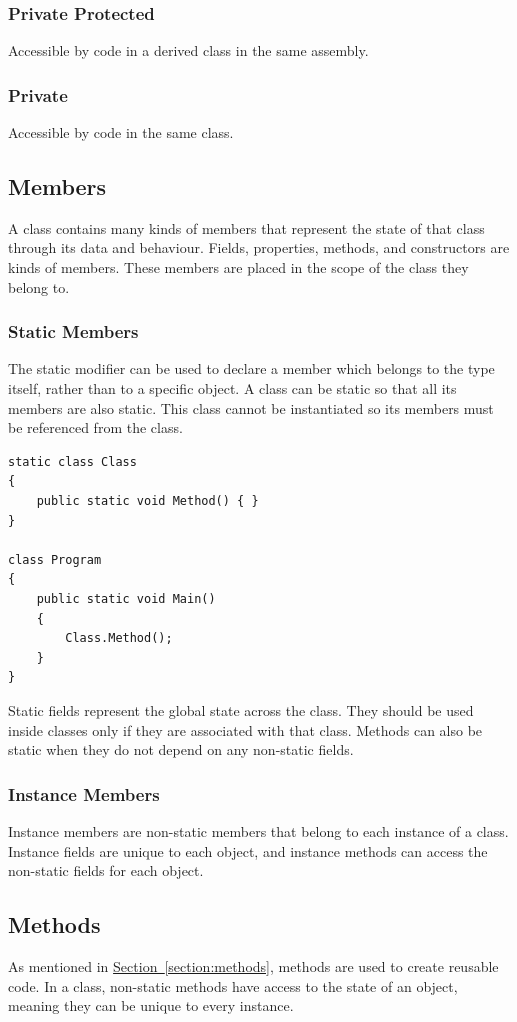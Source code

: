 \documentclass{article}
\begin{document}
\subsubsection{Private Protected}
Accessible by code in a derived class in the same assembly.
\subsubsection{Private}
Accessible by code in the same class.
\subsection{Members}
A class contains many kinds of members that represent the state of that
class through its data and behaviour. Fields, properties, methods, and
constructors are kinds of members. These members are placed in the
scope of the class they belong to.
\subsubsection{Static Members}
The static modifier can be used to declare a member which belongs to
the type itself, rather than to a specific object. A class can be
static so that all its members are also static. This class cannot be
instantiated so its members must be referenced from the class.
\begin{verbatim}
static class Class
{
    public static void Method() { }
}

class Program
{
    public static void Main()
    {
        Class.Method();
    }
}
\end{verbatim}
Static fields represent the global state across the class. They should
be used inside classes only if they are associated with that class.
Methods can also be static when they do not depend on any non-static
fields.
\subsubsection{Instance Members}
Instance members are non-static members that belong to each instance of
a class. Instance fields are unique to each object, and instance
methods can access the non-static fields for each object.
\subsection{Methods}
As mentioned in
\hyperref[section:methods]{Section~\ref{section:methods}}, methods are
used to create reusable code. In a class, non-static methods have
access to the state of an object, meaning they can be unique to every
instance.
\end{document}
